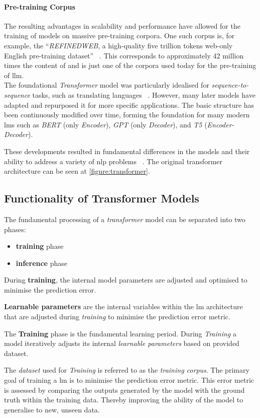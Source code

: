 \paragraph{Pre-training Corpus}
The resulting advantages in scalability and performance have allowed for the training of models on massive pre-training corpora.
%
One such corpus is, for example, the \enquote{\textit{REFINEDWEB}, a high-quality five trillion tokens web-only English pre-training dataset} ~\citep{penedo2023refinedwebdatasetfalconllm}.
This corresponds to approximately 42 million times the content of \citet{bb2} and is just one of the corpora used today for the pre-training of \ac{llm}.\\
%
The foundational \textit{Transformer} model was particularly idealised for \textit{sequence-to-sequence} tasks, such as translating languages ~\citep{vaswani2017attention}.
However, many later models have adapted and repurposed it for more specific applications. 
The basic structure has been continuously modified over time, forming the foundation for many modern \acp{lm} such as \textit{BERT} (only \textit{Encoder}), \textit{GPT} (only \textit{Decoder}), and \textit{T5} (\textit{Encoder-Decoder}).

These developments resulted in fundamental differences in the models and their ability to address a variety of \ac{nlp} problems ~\citep{raffel2020exploring}.
%
The original transformer architecture can be seen at \cref{figure:transformer}.
\subsection{Functionality of Transformer Models}
%
The fundamental processing of a \textit{transformer} model can be separated into two phases:
\begin{itemize}
    \item \textbf{training} phase
    \item \textbf{inference} phase
\end{itemize}
%
During \textbf{training}, the internal model parameters are adjusted and optimised to minimise the prediction error.
\begin{definition}\label{def:learnable_par}
\textbf{Learnable parameters} are the internal variables within the \ac{lm} architecture that are adjusted during \textit{training} to minimise the prediction error metric.
\end{definition}
%
\begin{definition}\label{def:training}
    The \textbf{Training} phase is the fundamental learning period.
    During \textit{Training} a model iteratively adjusts its internal \textit{learnable parameters} based on provided dataset.
\end{definition}
The \textit{dataset} used for \textit{Training} is referred to as the \textit{training corpus}.
The primary goal of training a \ac{lm} is to minimise the prediction error metric.
This error metric is assessed by comparing the outputs generated by the model with the ground truth within the training data.
Thereby improving the ability of the model to generalise to new, unseen data.
